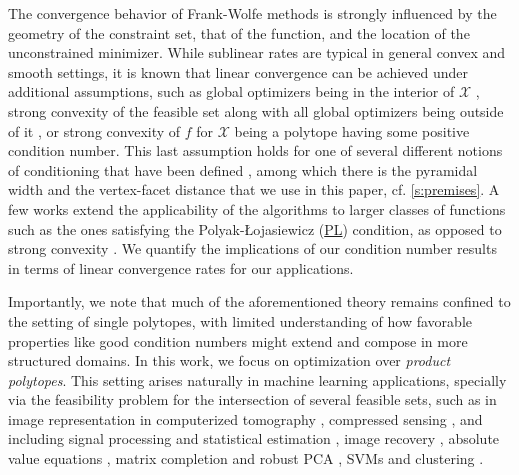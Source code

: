 \documentclass{article}
\makeatletter
\newcommand\newlink[2]{\hyperlink{#1}{\normalcolor #2}}
\newcommand\newtarget[2]{\Hy@raisedlink{\hypertarget{#1}{}}#2}
\newcommand{\PL}{\newlink{def:acronym_polyak_lojasiewicz}{PL}}
\newcommand{\X}{\mathcal{X}}
\makeatother
\begin{document}
The convergence behavior of Frank-Wolfe methods is strongly influenced by the geometry of the constraint set, that of the function, and the location of the unconstrained minimizer. While sublinear rates are typical in general convex and smooth settings, it is known that linear convergence can be achieved under additional assumptions, such as global optimizers being in the interior of $\X$ \citep{wolfe1970convergence,guelat1986some}, strong convexity of the feasible set along with all global optimizers being outside of it \citep{levitin1966constrained}, or strong convexity of $f$ for $\X$ being a polytope having some positive condition number. This last assumption holds for one of several different notions of conditioning that have been defined \citep{lacoste2013affine,GH15,LJ15,BS15,penya2016vonneumann,PR18}, %
among which there is the pyramidal width and the vertex-facet distance that we use in this paper, cf. \cref{s:premises}. A few works extend the applicability of the algorithms to larger classes of functions such as the ones satisfying the Polyak-\L{}ojasiewicz (\newtarget{def:acronym_polyak_lojasiewicz}{\PL{}}) condition, as opposed to strong convexity \citep{BS15,BCC+23}. We quantify the implications of our condition number results in terms of linear convergence rates for our applications.

Importantly, we note that much of the aforementioned theory remains confined to the setting of single polytopes, with limited understanding of how favorable properties like good condition numbers might extend and compose in more structured domains. In this work, we focus on optimization over \emph{product polytopes}. This setting arises naturally in machine learning applications, specially via the feasibility problem for the intersection of several feasible sets, such as in image representation in computerized tomography \cite{CCC+09}, compressed sensing \cite{CCP12},
and including signal processing and statistical estimation \cite{SY98,CP10proximal}, image recovery \cite{Com96}, absolute value equations \cite{ACT23}, matrix completion \cite{RSV12} and robust PCA \cite{MA18}, SVMs \cite{LJS+13} and clustering \cite{BRZ23}.
\end{document}
